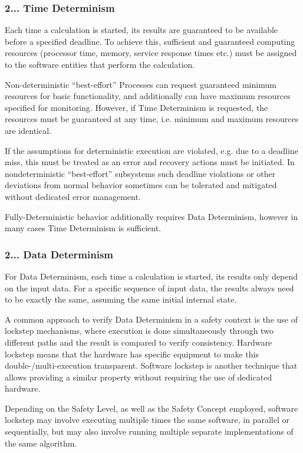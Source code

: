 \subsubsection*{2... {\bfseries Time Determinism}}


\begin{DoxyItemize}
\item Each time a calculation is started, its results are guaranteed to be available before a specified deadline. To achieve this, sufficient and guaranteed computing resources (processor time, memory, service response times etc.) must be assigned to the software entities that perform the calculation.
\item Non-\/deterministic “best-\/effort” Processes can request guaranteed minimum resources for basic functionality, and additionally can have maximum resources specified for monitoring. However, if Time Determinism is requested, the resources must be guaranteed at any time, i.\+e. minimum and maximum resources are identical.
\item If the assumptions for deterministic execution are violated, e.\+g. due to a deadline miss, this must be treated as an error and recovery actions must be initiated. In nondeterministic “best-\/effort” subsystems such deadline violations or other deviations from normal behavior sometimes can be tolerated and mitigated without dedicated error management.
\item Fully-\/\+Deterministic behavior additionally requires Data Determinism, however in many cases Time Determinism is sufficient.
\end{DoxyItemize}

\subsubsection*{2... {\bfseries Data Determinism}}


\begin{DoxyItemize}
\item For Data Determinism, each time a calculation is started, its results only depend on the input data. For a specific sequence of input data, the results always need to be exactly the same, assuming the same initial internal state.
\item A common approach to verify Data Determinism in a safety context is the use of lockstep mechanisms, where execution is done simultaneously through two different paths and the result is compared to verify consistency. Hardware lockstep means that the hardware has specific equipment to make this double-\//multi-\/execution transparent. Software lockstep is another technique that allows providing a similar property without requiring the use of dedicated hardware.
\item Depending on the Safety Level, as well as the Safety Concept employed, software lockstep may involve executing multiple times the same software, in parallel or sequentially, but may also involve running multiple separate implementations of the same algorithm.
\end{DoxyItemize}


